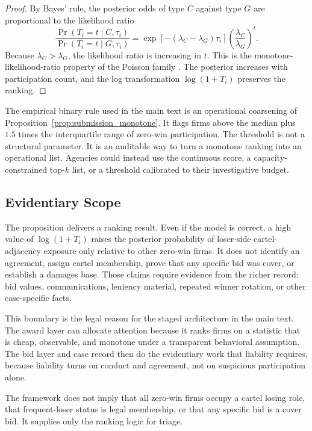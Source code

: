 \begin{proof}
By Bayes' rule, the posterior odds of type $C$ against type $G$
are proportional to the likelihood ratio
\[
  \frac{\Pr(T_i=t\mid C,\tau_i)}
       {\Pr(T_i=t\mid G,\tau_i)}
  =
  \exp[-(\lambda_C-\lambda_G)\tau_i]
  \left(\frac{\lambda_C}{\lambda_G}\right)^t .
\]
Because $\lambda_C>\lambda_G$, the likelihood ratio is increasing
in $t$. This is the monotone-likelihood-ratio property of the
Poisson family \citep{karlin1956mlr}. The posterior increases
with participation count, and the log transformation
$\log(1+T_i)$ preserves the ranking.
\end{proof}

The empirical binary rule used in the main text is an operational
coarsening of Proposition~\ref{prop:submission_monotone}. It flags firms above the
median plus $1.5$ times the interquartile range of zero-win
participation. The threshold is not a structural parameter. It
is an auditable way to turn a monotone ranking into an
operational list. Agencies could instead use the continuous
score, a capacity-constrained top-$k$ list, or a threshold
calibrated to their investigative budget.

\subsection{Evidentiary Scope}
\label{app:framework_scope}

The proposition delivers a ranking result. Even if the model is
correct, a high value of
$\log(1+T_i)$ raises the posterior probability of loser-side
cartel-adjacency exposure only relative to other zero-win firms.
It does not
identify an agreement, assign cartel membership, prove that any
specific bid was cover, or establish a damages base. Those
claims require evidence from the richer record: bid values,
communications, leniency material, repeated winner rotation, or
other case-specific facts.

This boundary is the legal reason for the staged architecture in
the main text. The award layer can allocate attention because it
ranks firms on a statistic that is cheap, observable, and
monotone under a transparent behavioral assumption. The bid layer
and case record then do the evidentiary work that liability
requires, because liability turns on conduct and agreement, not
on suspicious participation alone.

The framework does not imply that all zero-win firms occupy a
cartel losing role, that frequent-loser status is legal
membership, or that any specific bid is a cover bid. It supplies
only the ranking logic for triage.

